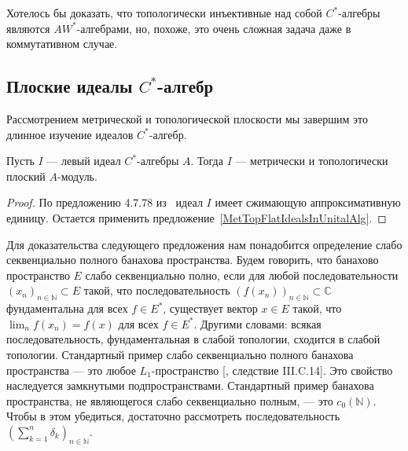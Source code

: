 Хотелось бы доказать, что топологически инъективные над собой $C^*$-алгебры
являются $AW^*$-алгебрами, но, похоже, это очень сложная задача даже в
коммутативном случае.


\subsection{Плоские идеалы 
    \texorpdfstring{$C^*$}{C*}-алгебр}\label{
        SubSectionFlatIdealsOfCStarAlgebras}

Рассмотрением метрической и топологической плоскости мы завершим это длинное
изучение идеалов $C^*$-алгебр.

\begin{proposition}\label{IdealofCstarAlgisMetTopFlat} Пусть $I$ --- левый идеал
$C^*$-алгебры $A$. Тогда $I$ --- метрически и топологически плоский $A$-модуль.
\end{proposition}
\begin{proof} По предложению 4.7.78 из~\cite{HelBanLocConvAlg} идеал $I$ имеет
сжимающую аппроксимативную единицу. Остается применить
предложение~\ref{MetTopFlatIdealsInUnitalAlg}.
\end{proof}

Для доказательства следующего предложения нам понадобится определение слабо
секвенциально полного банахова пространства. Будем говорить, что банахово
пространство $E$ слабо секвенциально полно, если для любой последовательности
${(x_n)}_{n\in\mathbb{N}}\subset E$ такой, что последовательность
${(f(x_n))}_{n\in\mathbb{N}}\subset\mathbb{C}$ фундаментальна для 
всех $f\in E^*$, существует вектор $x\in E$ такой, 
что $\lim_n f(x_n)=f(x)$ для всех $f\in E^*$.
Другими словами: всякая последовательность, фундаментальная в слабой топологии,
сходится в слабой топологии. Стандартный пример слабо секвенциально полного
банахова пространства --- это любое $L_1$-пространство
[\cite{WojBanSpForAnalysts}, следствие III.C.14]. Это свойство наследуется
замкнутыми подпространствами. Стандартный пример банахова пространства, не
являющегося слабо секвенциально полным, --- это $c_0(\mathbb{N})$. Чтобы в этом
убедиться, достаточно рассмотреть последовательность 
${(\sum_{k=1}^n\delta_k)}_{n\in\mathbb{N}}$. 

